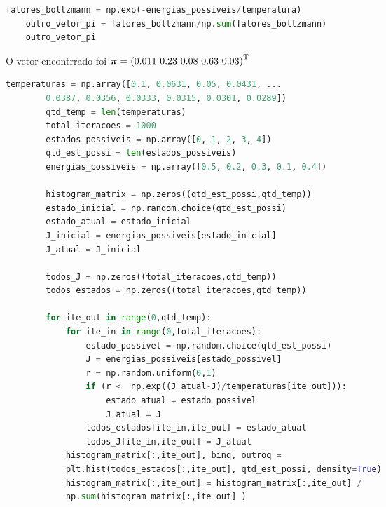 \documentclass{homeworkclass}
\begin{document}
\begin{homeworkProblem}
\begin{homeworkSection}
\end{homeworkSection}

\begin{homeworkSection}[d) Calcule os fatores de Boltzmann (ou seja, $e^{-(J(x)/T)}$) associados aos dados da tabela acima, e compare-os com o resultado do item (c). Use $T = 0.1$.]

\begin{lstlisting}[language=Python]
	fatores_boltzmann = np.exp(-energias_possiveis/temperatura)
	outro_vetor_pi = fatores_boltzmann/np.sum(fatores_boltzmann)
	outro_vetor_pi
\end{lstlisting}
O vetor encontrrado foi $\boldsymbol{\pi} = \left( 0.011 \, \, 0.23 \, \, 0.08 \, \, 0.63 \, \, 0.03 \right)^{\mathrm{T}}$

\end{homeworkSection}

\begin{homeworkSection}

	\begin{lstlisting}[language=Python]
		temperaturas = np.array([0.1, 0.0631, 0.05, 0.0431, ...
		0.0387, 0.0356, 0.0333, 0.0315, 0.0301, 0.0289])
		qtd_temp = len(temperaturas)
		total_iteracoes = 1000
		estados_possiveis = np.array([0, 1, 2, 3, 4])
		qtd_est_possi = len(estados_possiveis)
		energias_possiveis = np.array([0.5, 0.2, 0.3, 0.1, 0.4])

		histogram_matrix = np.zeros((qtd_est_possi,qtd_temp))
		estado_inicial = np.random.choice(qtd_est_possi)
		estado_atual = estado_inicial
		J_inicial = energias_possiveis[estado_inicial]
		J_atual = J_inicial

		todos_J = np.zeros((total_iteracoes,qtd_temp))
		todos_estados = np.zeros((total_iteracoes,qtd_temp))

		for ite_out in range(0,qtd_temp):
			for ite_in in range(0,total_iteracoes):
				estado_possivel = np.random.choice(qtd_est_possi)
				J = energias_possiveis[estado_possivel]
				r = np.random.uniform(0,1)
				if (r <  np.exp((J_atual-J)/temperaturas[ite_out])):
					estado_atual = estado_possivel
					J_atual = J
				todos_estados[ite_in,ite_out] = estado_atual
				todos_J[ite_in,ite_out] = J_atual
			histogram_matrix[:,ite_out], binq, outroq =
			plt.hist(todos_estados[:,ite_out], qtd_est_possi, density=True)
			histogram_matrix[:,ite_out] = histogram_matrix[:,ite_out] /
			np.sum(histogram_matrix[:,ite_out] )
	\end{lstlisting}


\end{homeworkSection}
\end{homeworkProblem}
\end{document}
